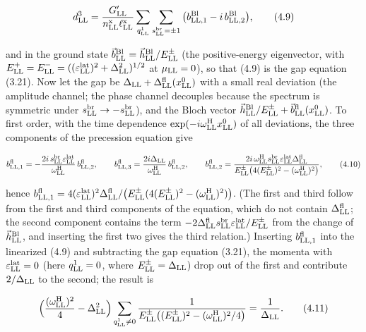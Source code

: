 \documentclass[
  10pt,
]{article}
\begin{document}
\[d^3_{\rm LL}=\frac{G'_{\rm LL}}{n^{\rm x}_{\rm LL}\ell^{\rm x}_{\rm LL}}\sum_{q^1_{\rm LL}}\sum_{s^{\rm br}_{\rm LL}=\pm1}\big(b^{\rm Bl}_{{\rm LL},1}-i\,b^{\rm Bl}_{{\rm LL},2}\big),\tag{4.9}\]

and in the ground state
\(\vec b^{\rm Bl}_{\rm LL}=\vec h^{\rm Bl}_{\rm LL}/E^\pm_{\rm LL}\)
(the positive-energy eigenvector, with
\(E^+_{\rm LL}=E^-_{\rm LL}=((\varepsilon^{\rm lat}_{\rm LL})^2+\Delta_{\rm LL}^2)^{1/2}\)
at \(\mu_{\rm LL}=0\)), so that (4.9) is the gap equation (3.21). Now
let the gap be
\(\Delta_{\rm LL}+\Delta^{\rm fl}_{\rm LL}(x^0_{\rm LL})\) with a small
real deviation (the amplitude channel; the phase channel decouples
because the spectrum is symmetric under
\(s^{\rm br}_{\rm LL}\to-s^{\rm br}_{\rm LL}\)), and the Bloch vector
\(\vec h^{\rm Bl}_{\rm LL}/E^\pm_{\rm LL}+\vec b^{\rm fl}_{\rm LL}(x^0_{\rm LL})\).
To first order, with the time dependence
\(\exp(-i\omega^{\rm H}_{\rm LL}x^0_{\rm LL})\) of all deviations, the
three components of the precession equation give

\[b^{\rm fl}_{{\rm LL},1}=-\frac{2i\,s^{\rm br}_{\rm LL}\varepsilon^{\rm lat}_{\rm LL}}{\omega^{\rm H}_{\rm LL}}\,b^{\rm fl}_{{\rm LL},2},\qquad b^{\rm fl}_{{\rm LL},3}=\frac{2i\Delta_{\rm LL}}{\omega^{\rm H}_{\rm LL}}\,b^{\rm fl}_{{\rm LL},2},\qquad b^{\rm fl}_{{\rm LL},2}=\frac{2i\,\omega^{\rm H}_{\rm LL}s^{\rm br}_{\rm LL}\varepsilon^{\rm lat}_{\rm LL}\Delta^{\rm fl}_{\rm LL}}{E^\pm_{\rm LL}\big(4(E^\pm_{\rm LL})^2-(\omega^{\rm H}_{\rm LL})^2\big)},\tag{4.10}\]

hence
\(b^{\rm fl}_{{\rm LL},1}=4(\varepsilon^{\rm lat}_{\rm LL})^2\Delta^{\rm fl}_{\rm LL}/\big(E^\pm_{\rm LL}(4(E^\pm_{\rm LL})^2-(\omega^{\rm H}_{\rm LL})^2)\big)\).
(The first and third follow from the first and third components of the
equation, which do not contain \(\Delta^{\rm fl}_{\rm LL}\); the second
component contains the term
\(-2\Delta^{\rm fl}_{\rm LL}s^{\rm br}_{\rm LL}\varepsilon^{\rm lat}_{\rm LL}/E^\pm_{\rm LL}\)
from the change of \(\vec h^{\rm Bl}_{\rm LL}\), and inserting the first
two gives the third relation.) Inserting \(b^{\rm fl}_{{\rm LL},1}\)
into the linearized (4.9) and subtracting the gap equation (3.21), the
momenta with \(\varepsilon^{\rm lat}_{\rm LL}=0\) (here
\(q^1_{\rm LL}=0\), where \(E^\pm_{\rm LL}=\Delta_{\rm LL}\)) drop out
of the first and contribute \(2/\Delta_{\rm LL}\) to the second; the
result is

\[\Big(\frac{(\omega^{\rm H}_{\rm LL})^2}4-\Delta_{\rm LL}^2\Big)\sum_{q^1_{\rm LL}\neq0}\frac1{E^\pm_{\rm LL}\big((E^\pm_{\rm LL})^2-(\omega^{\rm H}_{\rm LL})^2/4\big)}=\frac1{\Delta_{\rm LL}}.\tag{4.11}\]
\end{document}
